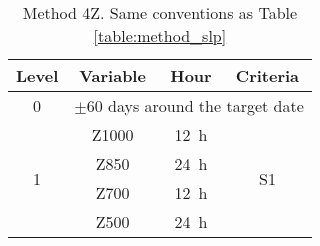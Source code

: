 \documentclass[twocol]{ametsoc}
\begin{document}
\begin{table}[t]
	\caption{Method 4Z. Same conventions as Table \ref{table:method_slp}}
	\begin{center}
		\begin{tabular}{cccc}
			\hline
			\textbf{Level} & \textbf{Variable} & \textbf{Hour} & \textbf{Criteria} \\ 
			\hline 
			0 & \multicolumn{3}{l}{$\pm 60$ days around the target date} \\
			\hline 
			\multirow{4}{*}{1} & Z1000 & 12~h & \multirow{4}{*}{S1} \\
			& Z850 & 24~h & \\ 
			& Z700 & 12~h & \\ 
			& Z500 & 24~h & \\ 
			\hline 
		\end{tabular}
	\end{center}
	\label{table:R6}
\end{table}



%
\end{document}
